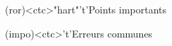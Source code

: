 \documentclass[../../main/main.tex]{subfiles}
\begin{document}
\begin{tcn}[%
		sidebyside, fontupper=\small, fontlower=\small
	]
	\begin{tcn}[nsp](ror)<ctc>"hart"'t'{Points importants}
	\end{tcn}
	\begin{tcn}[nsp](impo)<ctc>'t'{Erreurs communes}
	\end{tcn}
\end{tcn}
\end{document}
